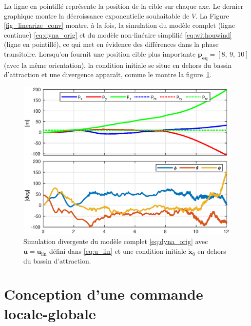  La ligne en pointillé représente la position de la cible sur chaque axe. Le dernier graphique montre la décroissance exponentielle souhaitable de $V$.
La Figure \ref{fig_linearize_conv} montre, à la fois, la simulation du modèle complet (ligne continue) \eqref{eq:dyna_orig} et du modèle non-linéaire simplifié \eqref{eq:withouwind} (ligne en pointillé), ce qui met en évidence des différences dans la phase transitoire.
Lorsqu'on fournit une position cible plus importante $\boldsymbol{p_{\text{eq}}} =[8,~9,~10]$(avec la même orientation), la condition initiale se situe en dehors du bassin d'attraction et une divergence apparaît, comme le montre la figure~\ref{fig_linearize_div}.

\begin{figure}[ht!]
    \centering
    \includegraphics[trim=0cm 0cm 0cm 0cm,clip,width=0.8\columnwidth]{figures/diverge2.eps}
    \caption{Simulation divergente du modèle complet \eqref{eq:dyna_orig} avec $\boldsymbol{u} = \boldsymbol{u}_{\text{lin}}$ défini dans 
    \eqref{eq:u_lin} et une condition initiale $\tilde{ \boldsymbol{x}}_0$ en dehors du bassin d'attraction.}
    \label{fig_linearize_div}
\end{figure}



\section{Conception d'une commande locale-globale}
\label{sec:ctrl_hyste}
 
